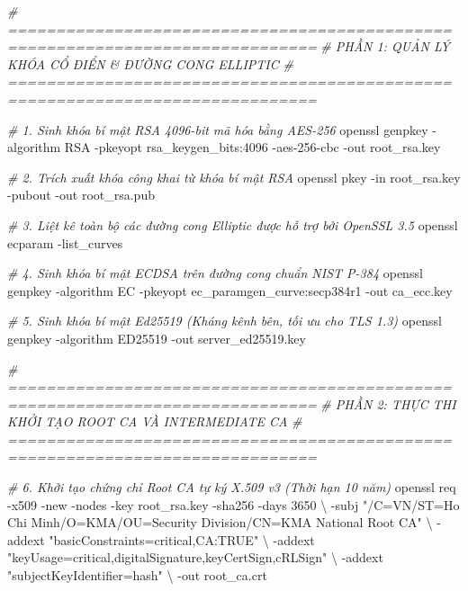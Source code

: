 \documentclass[
]{article}
\newenvironment{Shaded}{}{}
\newcommand{\AttributeTok}[1]{\textcolor[rgb]{0.49,0.56,0.16}{#1}}
\newcommand{\CommentTok}[1]{\textcolor[rgb]{0.38,0.63,0.69}{\textit{#1}}}
\newcommand{\DataTypeTok}[1]{\textcolor[rgb]{0.56,0.13,0.00}{#1}}
\newcommand{\ExtensionTok}[1]{#1}
\newcommand{\NormalTok}[1]{#1}
\newcommand{\StringTok}[1]{\textcolor[rgb]{0.25,0.44,0.63}{#1}}
\begin{document}
\begin{Shaded}
\begin{Highlighting}[]
\CommentTok{\# ==============================================================================}
\CommentTok{\# PHẦN 1: QUẢN LÝ KHÓA CỔ ĐIỂN \& ĐƯỜNG CONG ELLIPTIC}
\CommentTok{\# ==============================================================================}

\CommentTok{\# 1. Sinh khóa bí mật RSA 4096{-}bit mã hóa bằng AES{-}256}
\ExtensionTok{openssl}\NormalTok{ genpkey }\AttributeTok{{-}algorithm}\NormalTok{ RSA }\AttributeTok{{-}pkeyopt}\NormalTok{ rsa\_keygen\_bits:4096 }\AttributeTok{{-}aes{-}256{-}cbc} \AttributeTok{{-}out}\NormalTok{ root\_rsa.key}

\CommentTok{\# 2. Trích xuất khóa công khai từ khóa bí mật RSA}
\ExtensionTok{openssl}\NormalTok{ pkey }\AttributeTok{{-}in}\NormalTok{ root\_rsa.key }\AttributeTok{{-}pubout} \AttributeTok{{-}out}\NormalTok{ root\_rsa.pub}

\CommentTok{\# 3. Liệt kê toàn bộ các đường cong Elliptic được hỗ trợ bởi OpenSSL 3.5}
\ExtensionTok{openssl}\NormalTok{ ecparam }\AttributeTok{{-}list\_curves}

\CommentTok{\# 4. Sinh khóa bí mật ECDSA trên đường cong chuẩn NIST P{-}384}
\ExtensionTok{openssl}\NormalTok{ genpkey }\AttributeTok{{-}algorithm}\NormalTok{ EC }\AttributeTok{{-}pkeyopt}\NormalTok{ ec\_paramgen\_curve:secp384r1 }\AttributeTok{{-}out}\NormalTok{ ca\_ecc.key}

\CommentTok{\# 5. Sinh khóa bí mật Ed25519 (Kháng kênh bên, tối ưu cho TLS 1.3)}
\ExtensionTok{openssl}\NormalTok{ genpkey }\AttributeTok{{-}algorithm}\NormalTok{ ED25519 }\AttributeTok{{-}out}\NormalTok{ server\_ed25519.key}

\CommentTok{\# ==============================================================================}
\CommentTok{\# PHẦN 2: THỰC THI KHỞI TẠO ROOT CA VÀ INTERMEDIATE CA}
\CommentTok{\# ==============================================================================}

\CommentTok{\# 6. Khởi tạo chứng chỉ Root CA tự ký X.509 v3 (Thời hạn 10 năm)}
\ExtensionTok{openssl}\NormalTok{ req }\AttributeTok{{-}x509} \AttributeTok{{-}new} \AttributeTok{{-}nodes} \AttributeTok{{-}key}\NormalTok{ root\_rsa.key }\AttributeTok{{-}sha256} \AttributeTok{{-}days}\NormalTok{ 3650 }\DataTypeTok{\textbackslash{}}
  \AttributeTok{{-}subj} \StringTok{"/C=VN/ST=Ho Chi Minh/O=KMA/OU=Security Division/CN=KMA National Root CA"} \DataTypeTok{\textbackslash{}}
  \AttributeTok{{-}addext} \StringTok{"basicConstraints=critical,CA:TRUE"} \DataTypeTok{\textbackslash{}}
  \AttributeTok{{-}addext} \StringTok{"keyUsage=critical,digitalSignature,keyCertSign,cRLSign"} \DataTypeTok{\textbackslash{}}
  \AttributeTok{{-}addext} \StringTok{"subjectKeyIdentifier=hash"} \DataTypeTok{\textbackslash{}}
  \AttributeTok{{-}out}\NormalTok{ root\_ca.crt}


\end{Highlighting}
\end{Shaded}
\end{document}
